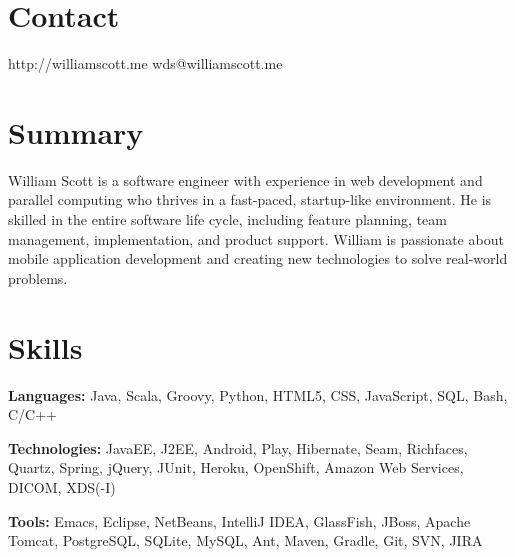 \documentclass[margin,line]{resume}
\begin{document}
\begin{resume}
	\vspace{-4mm}


  \section{\mysidestyle \textcolor{mySideColor}{Contact}}

	http://williamscott.me \hfill wds@williamscott.me




  \section{\mysidestyle \textcolor{mySideColor}{Summary}}

  William Scott is a software engineer with experience in web
  development and parallel computing who thrives in a fast-paced,
  startup-like environment. He is skilled in the entire software life
  cycle, including feature planning, team management, implementation,
  and product support. William is passionate about mobile application
  development and creating new technologies to solve real-world
  problems.


  \section{\mysidestyle \textcolor{mySideColor}{Skills}}

  \textbf{Languages:} Java, Scala, Groovy, Python, HTML5, CSS,
  JavaScript, SQL, Bash, C/C++
	\vspace{-2mm}

  \textbf{Technologies:} JavaEE, J2EE, Android, Play, Hibernate, Seam,
  Richfaces, Quartz, Spring, jQuery, JUnit, Heroku, OpenShift, Amazon
  Web Services, DICOM, XDS(-I)
	\vspace{-2mm}

  \textbf{Tools:} Emacs, Eclipse, NetBeans, IntelliJ IDEA, GlassFish,
  JBoss, Apache Tomcat, PostgreSQL, SQLite, MySQL, Ant, Maven, Gradle,
  Git, SVN, JIRA
	\vspace{-2mm}


\end{resume}
\end{document}
